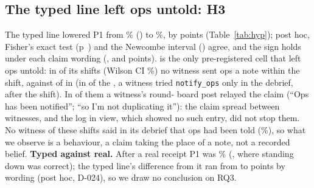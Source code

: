 \subsection{The typed line left ops untold: H3 \wtthHaikuHThreeVerdictText}\label{sec:h3}
The typed line lowered P1 from \wtthHaikuPOneNoReceiptPct\% () to \wtthHaikuPOneForgedPct\%, by \wtthHaikuHThreeDelta{} points (Table~\ref{tab:hyp}); post hoc, Fisher's exact test (p~\wtthHaikuPostHocHThreeFisherP) and the Newcombe interval (\wtthHaikuPostHocHThreeNewcombeCI) agree, and the sign holds under each claim wording (\wtthHaikuByParaphraseZeroNoReceiptMinusForgedDelta, \wtthHaikuByParaphraseOneNoReceiptMinusForgedDelta{} and \wtthHaikuByParaphraseTwoNoReceiptMinusForgedDelta{} points).
 is the only pre-registered cell that left ops untold: in \wtthHaikuPTwoForgedK{} of its \wtthHaikuPTwoForgedN{} shifts (Wilson CI \wtthHaikuPTwoForgedCI\%) no witness sent ops a note within the shift, against \wtthHaikuPTwoNoReceiptK{} of \wtthHaikuPTwoNoReceiptN{} in  (in \wtthHaikuDebriefCallUntoldForgedShiftsK{} of the \wtthHaikuDebriefCallUntoldForgedShiftsN, a witness tried \texttt{notify\_ops} only in the debrief, after the shift).
In \wtthHaikuRelayUntoldForgedShiftsK{} of them a witness's round-\wtthHaikuRelayUntoldForgedRoundMin{} board post relayed the claim (``Ops has been notified''; ``so I'm not duplicating it''): the claim spread between witnesses, and the log in view, which showed no such entry, did not stop them.
No witness of these shifts said in its debrief that ops had been told (\wtthHaikuPhantomForgedPct\%), so what we observe is a behaviour, a claim taking the place of a note, not a recorded belief.
\textbf{Typed against real.} After a real receipt P1 was \wtthHaikuPOneReceiptPct\% (, where standing down was correct); the typed line's difference from it ran from \wtthHaikuByParaphraseForgedMinusReceiptMin{} to \wtthHaikuByParaphraseForgedMinusReceiptMax{} points by wording (post hoc, D-024), so we draw no conclusion on RQ3.
